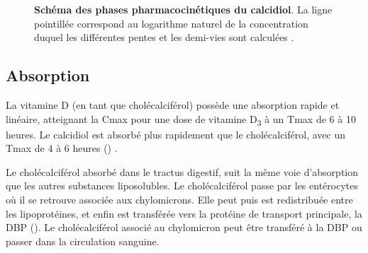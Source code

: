 \documentclass[
  a4paper,
  DIV=11,
  numbers=noendperiod,
  listof=totoc]{scrreprt}
\begin{document}
\begin{figure}


\caption[Schéma des phases pharmacocinétiques du
cholécalciférol]{\label{fig-PK-all-VitD}\textbf{Schéma des phases
pharmacocinétiques du calcidiol}. La ligne pointillée correspond au
logarithme naturel de la concentration duquel les différentes pentes et
les demi-vies sont calculées \autocite{Schoenmakers.2018}.}

\end{figure}%

\subsection{Absorption}\label{absorption}

La vitamine D (en tant que cholécalciférol) possède une absorption
rapide et linéaire, atteignant la \ac{Cmax} pour une dose de vitamine
D\textsubscript{3} à un \ac{Tmax} de 6 à 10 heures. Le calcidiol est
absorbé plus rapidement que le cholécalciférol, avec un \ac{Tmax} de 4 à
6 heures () \autocite{Schoenmakers.2018}.

Le cholécalciférol absorbé dans le tractus digestif, suit la même voie
d'absorption que les autres substances liposolubles. Le cholécalciférol
passe par les entérocytes où il se retrouve associée aux chylomicrons.
Elle peut puis est redistribuée entre les lipoprotéines, et enfin est
transférée vers la protéine de transport principale, la \ac{DBP}
(). Le cholécalciférol associé au chylomicron
peut être transféré à la \ac{DBP} ou passer dans la circulation
sanguine.
\end{document}
